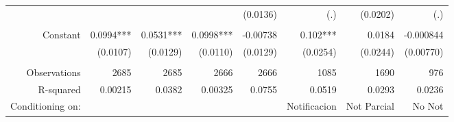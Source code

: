 \begin{tabular}{rrrrrrrr}
      &       &       &       & (0.0136) & (.)   & (0.0202) & (.) \\
      &       &       &       &       &       &       &  \\
Constant & 0.0994*** & 0.0531*** & 0.0998*** & -0.00738 & 0.102*** & 0.0184 & -0.000844 \\
      & (0.0107) & (0.0129) & (0.0110) & (0.0129) & (0.0254) & (0.0244) & (0.00770) \\
      &       &       &       &       &       &       &  \\
Observations & 2685  & 2685  & 2666  & 2666  & 1085  & 1690  & 976 \\
R-squared & 0.00215 & 0.0382 & 0.00325 & 0.0755 & 0.0519 & 0.0293 & 0.0236 \\
Conditioning on:  &       &       &       &       & Notificacion  & Not Parcial  & No Not  \\
\bottomrule
\end{tabular}%
